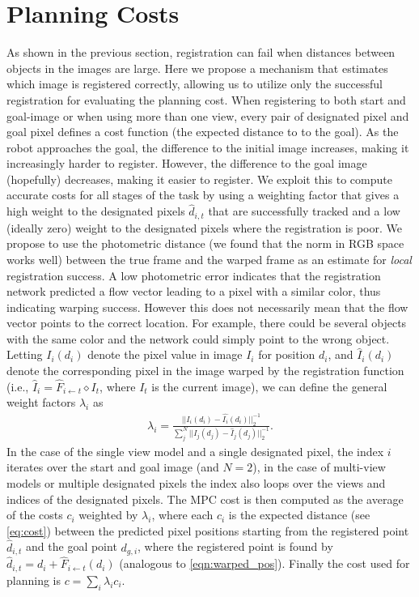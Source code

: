 \vspace{-0.1cm}
\section{Planning Costs}
\vspace{-0.2cm}
As shown in the previous section, registration can fail when distances between objects in the images are large. Here we propose a mechanism that estimates which image is registered correctly, allowing us to utilize only the successful registration for evaluating the planning cost.
When registering to both start and goal-image or when using more than one view, every pair of designated pixel and goal pixel defines a cost function (the expected distance to to the goal). As the robot approaches the goal, the difference to the initial image increases, making it increasingly harder to register. However, the difference to the goal image (hopefully) decreases, making it easier to register.
We exploit this to compute accurate costs for all stages of the task by using a weighting factor that gives a high weight to the designated pixels $\hat{d}_{i,t}$ that are successfully tracked and a low (ideally zero) weight to the designated pixels where the registration is poor. We propose to use the photometric distance (we found that the norm in RGB space works well) between the true frame and the warped frame as an estimate for \emph{local} registration success. A low photometric error indicates that the registration network predicted a flow vector leading to a pixel with a similar color, thus indicating warping success. However this does not necessarily mean that the flow vector points to the correct location. For example, there could be several objects with the same color and the network could simply point to the wrong object. Letting $I_i(d_i)$ denote the pixel value in image $I_i$ for position $d_i$, and $\hat{I}_i(d_i)$ denote the corresponding pixel in the image warped by the registration function (i.e., $\hat{I}_i = \hat{F}_{i \leftarrow t} \diamond I_t$, where $I_t$ is the current image), we can define the general weight factors $\lambda_i$ as
\begin{align}
\lambda_i =  \frac{||I_i(d_i) - \hat{I_i}(d_i)||_2^{-1}}{\sum^N_j ||I_j(d_j) - \hat{I}_j(d_j)||^{-1}_2}.
\label{eqn:cost_avg}
\end{align}
In the case of the single view model and a single designated pixel, the index $i$ iterates over the start and goal image (and $N=2$), in the case of multi-view models or multiple designated pixels the index also loops over the views and indices of the designated pixels. 
The MPC cost is then computed as the average of the costs $c_i$ weighted by $\lambda_i$, where each $c_i$ is the expected distance (see \autoref{eq:cost}) between the predicted pixel positions starting from the registered point $\hat{d}_{i,t}$ and the goal point $d_{g,i}$, where the registered point is found by $\hat{d}_{i,t} = d_i + \hat{F}_{i \leftarrow t}(d_i)$ (analogous to \autoref{eqn:warped_pos}). Finally the cost used for planning is $c = \sum_i \lambda_i c_i$.
